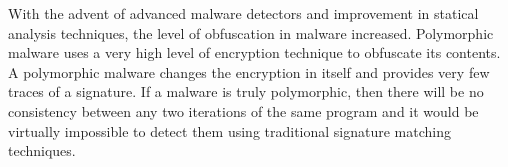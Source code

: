 With the advent of advanced malware detectors and improvement in statical analysis techniques, the level of obfuscation in malware increased. Polymorphic malware uses a very high level of encryption technique to obfuscate its contents. A polymorphic malware changes the encryption in itself and provides very few traces of a signature. If a malware is truly polymorphic, then there will be no consistency between any two iterations of the same program and it would be virtually impossible to detect them using traditional signature matching techniques.



